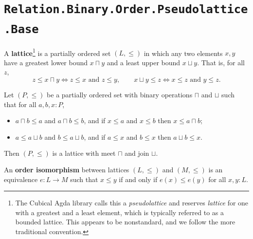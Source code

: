 \section{\texttt{Relation.Binary.Order.Pseudolattice.Base}}

\begin{definition}
  \label{IsPseudolattice}
  A \textbf{lattice}\footnote{The Cubical Agda library calls this a \emph{pseudolattice} and reserves \emph{lattice} for one with a greatest and a least element, which is typically referred to as a bounded lattice. This appears to be nonstandard, and we follow the more traditional convention.} is a partially ordered set $(L, \le)$ in which any two elements $x, y$ have a greatest lower bound $x \sqcap y$ and a least upper bound $x \sqcup y$. That is, for all $z$,
  \[
    z \le x \sqcap y \iff z \le x \text{ and } z \le y,
    \qquad
    x \sqcup y \le z \iff x \le z \text{ and } y \le z.
  \]
\end{definition}

\begin{lemma}
  \label{makePseudolatticeFromPoset}
  Let $(P, \le)$ be a partially ordered set with binary operations $\sqcap$ and $\sqcup$ such that for all $a, b, x : P$,
  \begin{itemize}
  \item $a \sqcap b \le a$ and $a \sqcap b \le b$, and if $x \le a$ and $x \le b$ then $x \le a \sqcap b$;
  \item $a \le a \sqcup b$ and $b \le a \sqcup b$, and if $a \le x$ and $b \le x$ then $a \sqcup b \le x$.
  \end{itemize}
  Then $(P, \le)$ is a lattice with meet $\sqcap$ and join $\sqcup$.
\end{lemma}

\begin{definition}
  \label{IsPseudolatticeEquiv}
  An \textbf{order isomorphism} between lattices $(L, \le)$ and $(M, \le)$ is an equivalence $e \colon L \to M$ such that $x \le y$ if and only if $e(x) \le e(y)$ for all $x, y : L$.
\end{definition}
